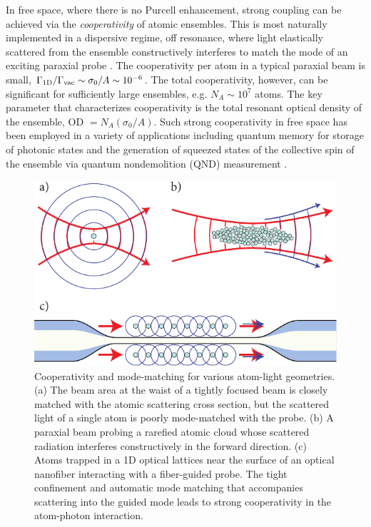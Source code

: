 \documentclass[preprint, aps,pra,onecolumn]{revtex4-1} %
\newcommand{\oneD}{{\rm 1D}}
\newcommand{\vac}{{\rm vac}}
\begin{document}
In free space, where there is no Purcell enhancement, strong coupling can be achieved via the {\em cooperativity} of atomic ensembles.  
This is most naturally implemented in a dispersive regime, off resonance, where light elastically scattered from the ensemble constructively interferes to match the mode of an exciting paraxial probe \cite{baragiola_three-dimensional_2014}.  The cooperativity per atom in a typical paraxial beam is small, $\Gamma_{\oneD}/\Gamma_{\vac} \sim \sigma_0/A  \sim 10^{-6}$.  
The total cooperativity, however, can be significant for sufficiently large ensembles, e.g. $N_A \sim  10^7$ atoms. The key parameter that characterizes cooperativity is the total resonant optical density of the ensemble, OD $= N_A (\sigma_0/A)$.  
Such strong cooperativity in free space has been employed in a variety of applications including quantum memory for storage of photonic states \cite{chaneliere_storage_2005} and the generation of squeezed states of the collective spin of the ensemble via quantum nondemolition (QND) measurement \cite{kuzmich_generation_2000, appel_mesoscopic_2009, takano_spin_2009, sewell_magnetic_2012}.   

\begin{figure}
\includegraphics[scale=0.80]{./Fig1}
\caption{Cooperativity and mode-matching for various atom-light geometries. (a) The  beam area at the waist of a tightly focused beam is closely matched with the atomic scattering cross section, but the scattered light of a single atom is poorly mode-matched with the probe. (b) A paraxial beam probing a rarefied atomic cloud whose scattered radiation interferes constructively in the forward direction. (c) Atoms trapped in a 1D optical lattices  near the surface of an optical nanofiber interacting with a fiber-guided probe. The tight confinement and automatic mode matching that accompanies scattering into the guided mode leads to strong cooperativity in the atom-photon interaction.}\label{Fig::ModeMatching}
\end{figure}
\end{document}
